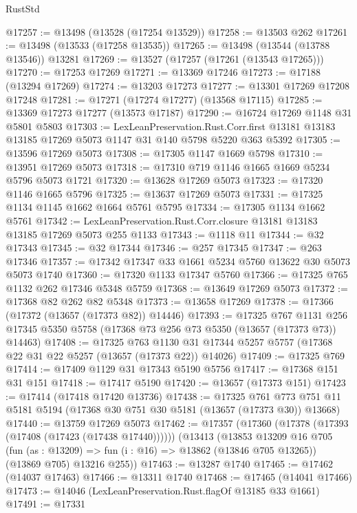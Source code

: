 \begin{lexlean}{RustStd}
\begin{coremodule}
@17257 := @13498 (@13528 (@17254 @13529))
@17258 := @13503 @262
@17261 := @13498 (@13533 (@17258 @13535))
@17265 := @13498 (@13544 (@13788 @13546)) @13281
@17269 := @13527 (@17257 (@17261 (@13543 @17265)))
@17270 := @17253 @17269
@17271 := @13369 @17246
@17273 := @17188 (@13294 @17269)
@17274 := @13203 @17273
@17277 := @13301 @17269 @17208 @17248
@17281 := @17271 (@17274 @17277) (@13568 @17115)
@17285 := @13369 @17273 @17277 (@13573 @17187)
@17290 := @16724 @17269 @1148 @31 @5801 @5803
@17303 := LexLeanPreservation.Rust.Corr.first
    @13181
    @13183
    @13185
    @17269
    @5073
    @1147
    @31
    @140
    @5798
    @5220
    @363
    @5392
@17305 := @13596 @17269 @5073
@17308 := @17305 @1147 @1669 @5798
@17310 := @13951 @17269 @5073
@17318 := @17310 @719 @1146 @1665 @1669 @5234 @5796 @5073 @1721
@17320 := @13628 @17269 @5073
@17323 := @17320 @1146 @1665 @5796
@17325 := @13637 @17269 @5073
@17331 := @17325 @1134 @1145 @1662 @1664 @5761 @5795
@17334 := @17305 @1134 @1662 @5761
@17342 := LexLeanPreservation.Rust.Corr.closure @13181 @13183 @13185 @17269 @5073 @255 @1133
@17343 := @1118 @11
@17344 := @32 @17343
@17345 := @32 @17344
@17346 := @257 @17345
@17347 := @263 @17346
@17357 := @17342 @17347 @33 @1661 @5234 @5760 @13622 @30 @5073 @5073 @1740
@17360 := @17320 @1133 @17347 @5760
@17366 := @17325 @765 @1132 @262 @17346 @5348 @5759
@17368 := @13649 @17269 @5073
@17372 := @17368 @82 @262 @82 @5348
@17373 := @13658 @17269
@17378 := @17366 (@17372 (@13657 (@17373 @82)) @14446)
@17393 := @17325
    @767
    @1131
    @256
    @17345
    @5350
    @5758
    (@17368 @73 @256 @73 @5350 (@13657 (@17373 @73)) @14463)
@17408 := @17325
    @763
    @1130
    @31
    @17344
    @5257
    @5757
    (@17368 @22 @31 @22 @5257 (@13657 (@17373 @22)) @14026)
@17409 := @17325 @769
@17414 := @17409 @1129 @31 @17343 @5190 @5756
@17417 := @17368 @151 @31 @151
@17418 := @17417 @5190
@17420 := @13657 (@17373 @151)
@17423 := @17414 (@17418 @17420 @13736)
@17438 := @17325
    @761
    @773
    @751
    @11
    @5181
    @5194
    (@17368 @30 @751 @30 @5181 (@13657 (@17373 @30)) @13668)
@17440 := @13759 @17269 @5073
@17462 := @17357
    (@17360 (@17378 (@17393 (@17408 (@17423 (@17438 @17440))))))
    (@13413
      (@13853
        @13209
        @16
        @705
        (fun (as : @13209) => fun (i : @16) => @13862 (@13846 @705 @13265))
        (@13869 @705)
        @13216
        @255))
@17463 := @13287 @1740
@17465 := @17462 (@14037 @17463)
@17466 := @13311 @1740
@17468 := @17465 (@14041 @17466)
@17473 := @14046 (LexLeanPreservation.Rust.flagOf @13185 @33 @1661)
@17491 := @17331

\end{coremodule}
\end{lexlean}
